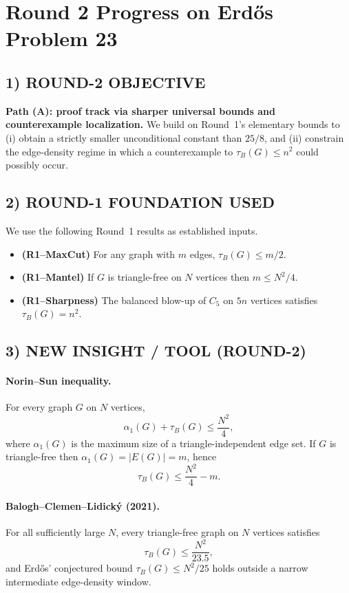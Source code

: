 \section{Round 2 Progress on Erd\H{o}s Problem 23}

\subsection*{1) ROUND-2 OBJECTIVE}
\textbf{Path (A): proof track via sharper universal bounds and counterexample localization.}
We build on Round~1's elementary bounds to (i) obtain a strictly smaller unconditional
constant than $25/8$, and (ii) constrain the edge-density regime in which a counterexample
to $\tau_B(G)\le n^2$ could possibly occur.

\subsection*{2) ROUND-1 FOUNDATION USED}
We use the following Round~1 results as established inputs.
\begin{itemize}
\item \textbf{(R1--MaxCut)} For any graph with $m$ edges, $\tau_B(G)\le m/2$.
\item \textbf{(R1--Mantel)} If $G$ is triangle-free on $N$ vertices then $m\le N^2/4$.
\item \textbf{(R1--Sharpness)} The balanced blow-up of $C_5$ on $5n$ vertices satisfies
      $\tau_B(G)=n^2$.
\end{itemize}

\subsection*{3) NEW INSIGHT / TOOL (ROUND-2)}
\paragraph{Norin--Sun inequality.}
For every graph $G$ on $N$ vertices,
\[
\alpha_1(G)+\tau_B(G)\le \frac{N^2}{4},
\]
where $\alpha_1(G)$ is the maximum size of a triangle-independent edge set.
If $G$ is triangle-free then $\alpha_1(G)=|E(G)|=m$, hence
\[
\tau_B(G)\le \frac{N^2}{4}-m.
\]

\paragraph{Balogh--Clemen--Lidick\'y (2021).}
For all sufficiently large $N$, every triangle-free graph on $N$ vertices satisfies
\[
\tau_B(G)\le \frac{N^2}{23.5},
\]
and Erd\H{o}s' conjectured bound $\tau_B(G)\le N^2/25$ holds outside a narrow intermediate
edge-density window.

